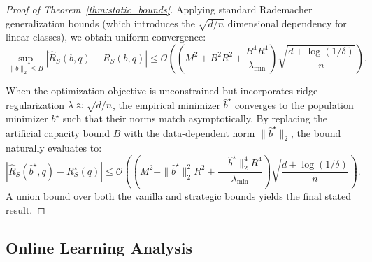 \begin{proof}[Proof of Theorem~\ref{thm:static_bounds}]
Applying standard Rademacher generalization bounds (which introduces the $\sqrt{d/n}$ dimensional dependency for linear classes), we obtain uniform convergence:
\begin{equation*}
    \sup_{\|b\|_2 \le B} |\hat{R}_S(b, q) - R_S(b, q)| \le \mathcal{O}\left( \left( M^2 + B^2 R^2 + \frac{B^4 R^4}{\lambda_{\min}} \right) \sqrt{\frac{d + \log(1/\delta)}{n}} \right).
\end{equation*}

When the optimization objective is unconstrained but incorporates ridge regularization $\lambda \approx \sqrt{d/n}$, the empirical minimizer $\hat{b}^\star$ converges to the population minimizer $b^\star$ such that their norms match asymptotically. By replacing the artificial capacity bound $B$ with the data-dependent norm $\|\hat{b}^\star\|_2$, the bound naturally evaluates to:
\begin{equation*}
    |\hat{R}_S(\hat{b}^\star,q) - R_S^\star(q)| \le \mathcal{O}\left( \left( M^2 + \|\hat{b}^\star\|_2^2 R^2 + \frac{\|\hat{b}^\star\|_2^4 R^4}{\lambda_{\min}} \right) \sqrt{\frac{d + \log(1/\delta)}{n}} \right).
\end{equation*}
A union bound over both the vanilla and strategic bounds yields the final stated result.
\end{proof}

\subsection{Online Learning Analysis}
\label{app:online_learning}


